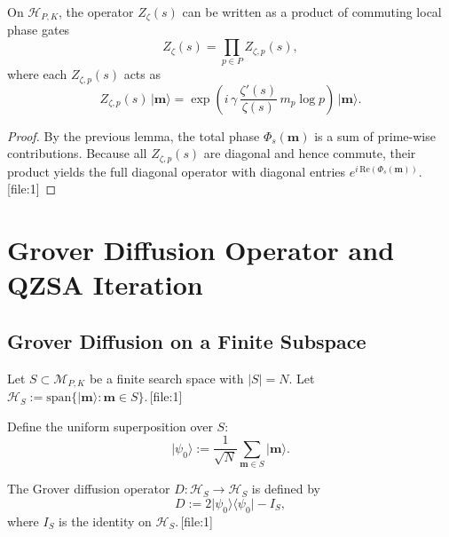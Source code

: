 \documentclass[11pt]{article}
\begin{document}
\begin{corollary}
On \(\mathcal{H}_{P,K}\), the operator \(Z_\zeta(s)\) can be written as a product of commuting local phase gates
\[
Z_\zeta(s) = \prod_{p \in P} Z_{\zeta,p}(s),
\]
where each \(Z_{\zeta,p}(s)\) acts as
\[
Z_{\zeta,p}(s)\,\lvert \mathbf{m} \rangle = \exp\!\left(i\,\gamma\,\frac{\zeta'(s)}{\zeta(s)}\, m_p \log p \right)\,\lvert \mathbf{m} \rangle.
\]
\end{corollary}

\begin{proof}
By the previous lemma, the total phase \(\Phi_s(\mathbf{m})\) is a sum of prime-wise contributions. Because all \(Z_{\zeta,p}(s)\) are diagonal and hence commute, their product yields the full diagonal operator with diagonal entries \(e^{i\,\mathrm{Re}(\Phi_s(\mathbf{m}))}\).\,[file:1]
\end{proof}

\section{Grover Diffusion Operator and QZSA Iteration}

\subsection{Grover Diffusion on a Finite Subspace}

Let \(S \subset \mathcal{M}_{P,K}\) be a finite search space with \(|S| = N\). Let \(\mathcal{H}_S := \text{span}\{\lvert \mathbf{m} \rangle : \mathbf{m} \in S\}\).\,[file:1]

\begin{definition}
Define the uniform superposition over \(S\):
\begin{equation}
    \lvert \psi_0 \rangle := \frac{1}{\sqrt{N}} \sum_{\mathbf{m} \in S} \lvert \mathbf{m} \rangle.
\end{equation}
\end{definition}

\begin{definition}
The Grover diffusion operator \(D: \mathcal{H}_S \to \mathcal{H}_S\) is defined by
\begin{equation}
    D := 2 \lvert \psi_0 \rangle \langle \psi_0 \rvert - I_S,
\end{equation}
where \(I_S\) is the identity on \(\mathcal{H}_S\).\,[file:1]
\end{definition}
\end{document}

